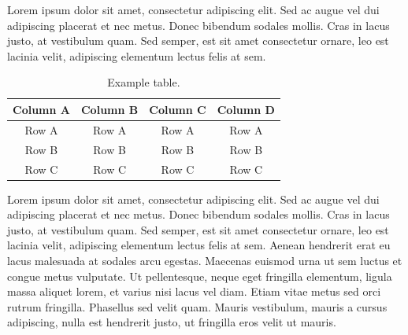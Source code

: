 Lorem ipsum dolor sit amet, consectetur adipiscing elit. Sed ac augue vel dui 
adipiscing placerat et nec metus. Donec bibendum sodales mollis. Cras in lacus 
justo, at vestibulum quam. Sed semper, est sit amet consectetur ornare, leo est 
lacinia velit, adipiscing elementum lectus felis at sem.

\begin{table}
	{\setlength{\tabcolsep}{14pt}
		\caption{Example table.}
		\begin{center}
			\vspace{-6mm}
			\begin{tabular}{cccc}
				\hline\hline
				Column A & Column B & Column C & Column D \\
				\hline
				Row A & Row A & Row A & Row A \\
				Row B & Row B & Row B & Row B \\
				Row C & Row C & Row C & Row C \\
				\hline
			\end{tabular}
			\vspace{-6mm}
		\end{center}
		\label{tableforCh4-1}}
\end{table}

Lorem ipsum dolor sit amet, consectetur adipiscing elit. Sed ac augue vel dui 
adipiscing placerat et nec metus. Donec bibendum sodales mollis. Cras in lacus 
justo, at vestibulum quam. Sed semper, est sit amet consectetur ornare, leo est 
lacinia velit, adipiscing elementum lectus felis at sem. Aenean hendrerit erat eu 
lacus malesuada at sodales arcu egestas. Maecenas euismod urna ut sem luctus et 
congue metus vulputate. Ut pellentesque, neque eget fringilla elementum, ligula 
massa aliquet lorem, et varius nisi lacus vel diam. Etiam vitae metus sed orci 
rutrum fringilla. Phasellus sed velit quam. Mauris vestibulum, mauris a cursus 
adipiscing, nulla est hendrerit justo, ut fringilla eros velit ut mauris.